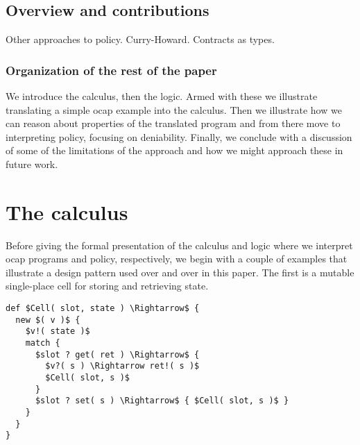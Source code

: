\documentclass[]{amsart}
\theoremstyle{definition}
\theoremstyle{remark}
\numberwithin{equation}{subsection}
\begin{document}
\subsection{Overview and contributions} 

Other approaches to policy. Curry-Howard. Contracts as types.

\subsubsection{Organization of the rest of the paper}

We introduce the calculus, then the logic. Armed with these we
illustrate translating a simple ocap example into the calculus. Then
we illustrate how we can reason about properties of the translated
program and from there move to interpreting policy, focusing on
deniability. Finally, we conclude with a discussion of some of the
limitations of the approach and how we might approach these in future
work.


\section{The calculus}

Before giving the formal presentation of the calculus and logic where
we interpret ocap programs and policy, respectively, we begin with a
couple of examples that illustrate a design pattern used over and over
in this paper. The first is a mutable single-place cell for storing
and retrieving state.


\begin{lstlisting}[mathescape]
def $Cell( slot, state ) \Rightarrow$ {
  new $( v )$ {
    $v!( state )$
    match {
      $slot ? get( ret ) \Rightarrow$ {
        $v?( s ) \Rightarrow ret!( s )$
        $Cell( slot, s )$
      }
      $slot ? set( s ) \Rightarrow$ { $Cell( slot, s )$ }
    }
  }
}
\end{lstlisting}
\end{document}

